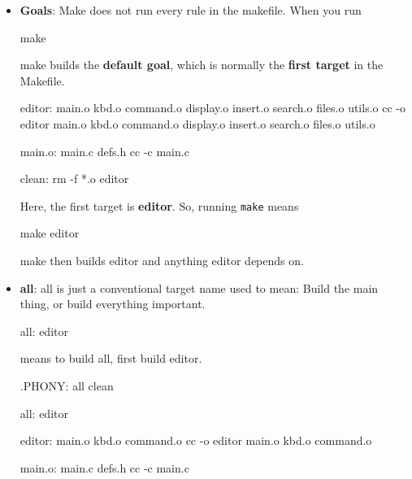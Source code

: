 \documentclass{report}
\begin{document}
\begin{itemize}
\begin{bashcode}
            clean: 
                rm -r *.o editor
            \end{bashcode}
            \bigbreak \noindent 
            \texttt{.PHONY} tells make: "clean is not a real file target. Always run its recipe when requested.".
        \item \textbf{Goals}: Make does not run every rule in the makefile. When you run
            \bigbreak \noindent 
            \begin{bashcode}
            make
            \end{bashcode}
            \bigbreak \noindent 
            make builds the \textbf{default goal}, which is normally the \textbf{first target} in the Makefile.
            \bigbreak \noindent 
            \begin{bashcode}
                editor: main.o kbd.o command.o display.o insert.o search.o files.o utils.o
                    cc -o editor main.o kbd.o command.o display.o insert.o search.o files.o utils.o

                main.o: main.c defs.h
                    cc -c main.c

                clean:
                    rm -f *.o editor
            \end{bashcode}
            \bigbreak \noindent 
            Here, the first target is \textbf{editor}. So, running \texttt{make} means
            \bigbreak \noindent 
            \begin{bashcode}
            make editor
            \end{bashcode}
            \bigbreak \noindent 
            make then builds editor and anything editor depends on. 
        \item \textbf{all}: all is just a conventional target name used to mean: Build the main thing, or build everything important.
            \bigbreak \noindent 
            \begin{bashcode}
            all: editor
            \end{bashcode}
            \bigbreak \noindent 
            means to build all, first build editor.
            \bigbreak \noindent 
            \begin{bashcode}
                .PHONY: all clean

                all: editor

                editor: main.o kbd.o command.o
                    cc -o editor main.o kbd.o command.o

                main.o: main.c defs.h
                    cc -c main.c


\end{bashcode}
\end{itemize}
\end{document}
